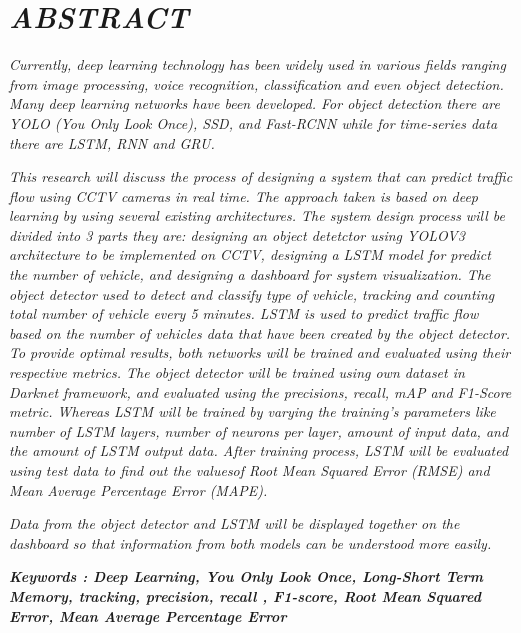 \documentclass[../thesis.tex]{subfiles}
\begin{document}
\chapter*{\emph{ABSTRACT}}%
\normalfont
\vspace{1.0cm}
\begin{singlespacing}%
{}

\emph{Currently, deep learning technology has been widely used in various fields ranging from image processing, voice recognition, classification and even object detection. Many deep learning networks have been developed. For object detection there are
YOLO (You Only Look Once), SSD, and Fast-RCNN while for time-series data there are LSTM, RNN and GRU.
}

\emph{This research will discuss the process of designing a system that can predict traffic flow using CCTV cameras in real time. The approach taken is based on deep learning by using several existing architectures.
The system design process will be divided into 3 parts they are: designing an object detetctor using YOLOV3 architecture to be implemented on CCTV, designing a LSTM model for predict the number of vehicle, and designing a dashboard for system visualization.
The object detector used to detect and classify type of vehicle, tracking and counting total number of vehicle every 5 minutes. 
LSTM is used to predict traffic flow based on the number of vehicles data that have been created by the object detector. 
To provide optimal results, both networks will be trained and evaluated using their respective metrics. 
The object detector will be trained using own dataset in Darknet framework, and evaluated using the precisions, recall, mAP and F1-Score metric.
Whereas LSTM will be trained by varying the training's parameters like number of LSTM layers, number of neurons per layer, amount of input data, and the amount of LSTM output data. After training process, LSTM will be evaluated using test data to find out the values ​​of Root Mean Squared Error (RMSE) and Mean Average Percentage Error (MAPE).
}

\emph{Data from the object detector and LSTM will be displayed together on the dashboard so that information from both models can be understood more easily.
}

\bigskip
\noindent

\textbf{\emph{Keywords : Deep Learning, You Only Look Once, Long-Short Term Memory, tracking, precision, recall , F1-score, Root Mean Squared Error, Mean Average Percentage Error }}
\end{singlespacing}
\end{document}
